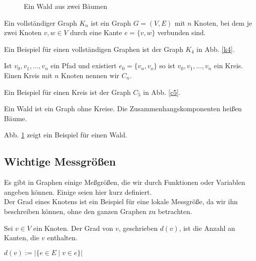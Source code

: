 \begin{figure}
	\centering
	\caption{Ein Wald aus zwei Bäumen}
	\label{wood}
\end{figure}
\begin{df}
Ein vollständiger Graph $K_n$ ist ein Graph $G = (V,E)$ mit $n$ Knoten, bei dem je zwei Knoten $v,w \in V$ durch eine Kante $ e = \{v,w\} $ verbunden sind.
\end{df}
Ein Beispiel für einen vollständigen Graphen ist der Graph $K_4$ in Abb. \ref{k4}.
\begin{df}
Ist $v_0,v_1,\dotsc,v_n$ ein Pfad und existiert $e_0 = \{v_n, v_o\}$ so ist $v_0, v_1, \dotsc, v_n$ ein Kreis. Einen Kreis mit $n$ Knoten nennen wir $C_n$.
\end{df}
Ein Beispiel für einen Kreis ist der Graph $C_5$ in Abb. \ref{c5}.
\begin{df}
Ein Wald ist ein Graph ohne Kreise. Die Zusammenhangskomponenten heißen Bäume.
\end{df}
Abb. \ref{wood} zeigt ein Beispiel für einen Wald.





\subsection{Wichtige Messgrößen}
Es gibt in Graphen einige Meßgrößen, die wir durch Funktionen oder Variablen angeben können. Einige seien hier kurz definiert.\\

Der Grad eines Knotens ist ein Beispiel für eine lokale Messgröße, da wir ihn beschreiben können, ohne den ganzen Graphen zu betrachten.
\begin{df}
Sei $v \in V$ ein Knoten.
Der Grad von $v$, geschrieben $d(v)$, ist die Anzahl an Kanten, die $v$ enthalten.
\begin{center}
$d(v) := |\{e \in E \mid v \in e\}|$
\end{center}
\end{df}

